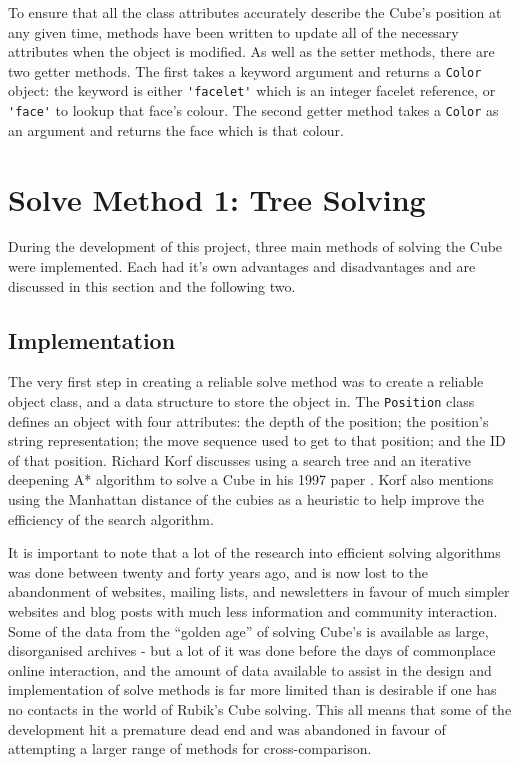 \documentclass{report}
\newenvironment{aside}
{\begin{mdframed}[style=0,%
		leftline=false,rightline=false,leftmargin=2em,rightmargin=2em,%
		innerleftmargin=0pt,innerrightmargin=0pt,linewidth=0.75pt,%
		skipabove=7pt,skipbelow=7pt]\small}
	{\end{mdframed}}
\begin{document}
    To ensure that all the class attributes accurately describe the Cube's position at any given time, methods have been written to update all of the necessary attributes when the object is modified. As well as the setter methods, there are two getter methods. The first takes a keyword argument and returns a \lstinline|Color| object: the keyword is either \lstinline|'facelet'| which is an integer facelet reference, or \lstinline|'face'| to lookup that face's colour. The second getter method takes a \lstinline|Color| as an argument and returns the face which is that colour.
    
    \section{Solve Method 1: Tree Solving} \label{sec:treeSolving}
    
    During the development of this project, three main methods of solving the Cube were implemented. Each had it's own advantages and disadvantages and are discussed in this section and the following two.
    
    \subsection{Implementation}
    
    The very first step in creating a reliable solve method was to create a reliable object class, and a data structure to store the object in. The \lstinline|Position| class defines an object with four attributes: the depth of the position; the position's string representation; the move sequence used to get to that position; and the ID of that position. Richard Korf discusses using a search tree and an iterative deepening A* algorithm to solve a Cube in his 1997 paper \cite{Korf1997}. Korf also mentions using the Manhattan distance of the cubies as a heuristic to help improve the efficiency of the search algorithm. 
    
   	\begin{aside}
   		    It is important to note that a lot of the research into efficient solving algorithms was done between twenty and forty years ago, and is now lost to the abandonment of websites, mailing lists, and newsletters in favour of much simpler websites and blog posts with much less information and community interaction. Some of the data from the \enquote{golden age} of solving Cube's is available as large, disorganised archives  - but a lot of it was done before the days of commonplace online interaction, and the amount of data available to assist in the design and implementation of solve methods is far more limited than is desirable if one has no contacts in the world of Rubik's Cube solving. This all means that some of the development hit a premature dead end and was abandoned in favour of attempting a larger range of methods for cross-comparison.
   	\end{aside}
\end{document}
